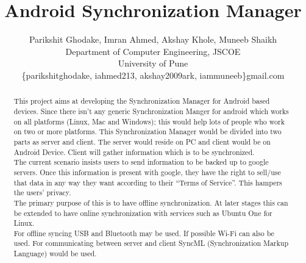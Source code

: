 \documentclass[%
	final,
	notitlepage,
	narroweqnarray,
	inline,
	twoside,
	]{ieee}
\newcommand{\latexiie}{\LaTeX2{\Large$_\varepsilon$}}
\begin{document}
\title{Android Synchronization Manager}

\author{Parikshit Ghodake, Imran Ahmed, Akshay Khole, Muneeb Shaikh \\
Department of Computer Engineering, JSCOE \\
University of Pune\\
\{parikshitghodake, iahmed213, akshay2009ark, iammuneeb\}gmail.com
}

\maketitle               

\begin{abstract} 
This project aims at developing the Synchronization Manager for Android based devices. Since there isn't any generic Synchronization Manger for android which works on all platforms (Linux, Mac and Windows); this would help lots of people who work on two or more platforms. This Synchronization Manager would be divided into two parts as server and client.  The server would reside on PC and client would be on Android Device. Client will gather information which is to be synchronized.\\
The current scenario insists users to send information to be backed up to google servers. Once this information is present with google, they have the right to sell/use that data in any way they want according to their “Terms of Service”. This hampers the users’ privacy. \\
The primary purpose of this is to have offline synchronization. At later stages this can be extended to have online synchronization with services such as Ubuntu One for Linux.\\
For offline syncing USB and Bluetooth may be used. If possible Wi-Fi can also be used. For communicating between server and client SyncML (Synchronization Markup Language) would be used.
\end{abstract}

\end{document}
